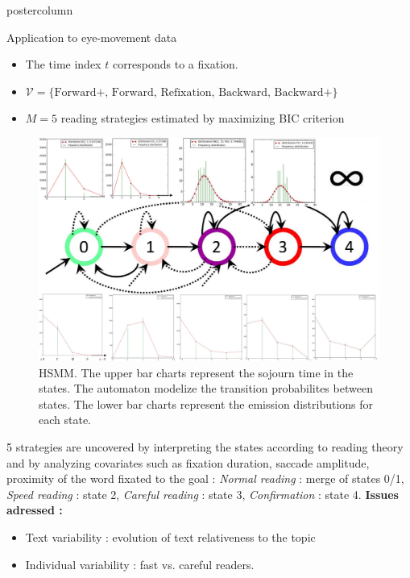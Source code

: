 \documentclass[final,hyperref={pdfpagelabels=false}]{beamer}
\begin{document}
\begin{frame}
\begin{columns}
\begin{column}{.49\textwidth}
\begin{beamercolorbox}[center,wd=\textwidth]{postercolumn}
\begin{minipage}[T]{.95\textwidth}
{            \vfill
            \begin{block}{Application to eye-movement data}
                \begin{itemize}
                    \item[\bullet] The time index $t$ corresponds to a fixation.
                    \item[\bullet] $\mathcal{V} = \{\text{Forward+, Forward, Refixation, Backward, Backward+}\}$
                    \item[\bullet] $M = 5$ reading strategies estimated by maximizing BIC criterion
                \end{itemize}
                \begin{figure}[h]
                    \centering
                    \includegraphics[width=35cm]{hsmm.jpg}
                    \caption{HSMM. The upper bar charts represent the sojourn time in the states.
                    The automaton modelize the transition probabilites between states.
                    The lower bar charts represent the emission distributions for each state.}
                \end{figure}
                5 strategies are uncovered by interpreting the states according to reading theory and by
                analyzing covariates such as fixation duration, saccade amplitude, proximity of the word fixated to the goal :
                \textit{Normal reading} : merge of states 0/1, \textit{Speed reading} : state 2,
                \textit{Careful reading} : state 3, \textit{Confirmation} : state 4.
                \vskip0.5cm
                \textbf{Issues adressed :}
                \begin{itemize}
                    \item[\bullet] Text variability : evolution of text relativeness to the topic
                    \item[\bullet] Individual variability : fast vs. careful readers.
                \end{itemize}
            \end{block}

}
\end{minipage}
\end{beamercolorbox}
\end{column}
\end{columns}
\end{frame}
\end{document}
